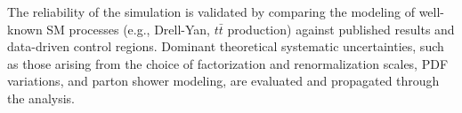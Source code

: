 The reliability of the simulation is validated by comparing the modeling of well-known SM processes (e.g., Drell-Yan, $t\bar{t}$ production) against published results and data-driven control regions. Dominant theoretical systematic uncertainties, such as those arising from the choice of factorization and renormalization scales, PDF variations, and parton shower modeling, are evaluated and propagated through the analysis.



